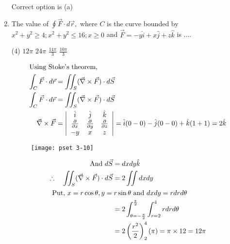 \begin{enumerate}[label=\color{ocre}\textbf{\arabic*.}]
\begin{answer}
\begin{align*}
	\end{align*}
 Correct option is (a)
\end{answer}
\item The value of $\oint \vec{F} \cdot d \vec{r},$ where $C$ is the curve bounded by $x^{2}+y^{2} \geq 4 ; x^{2}+y^{2} \leq 16 ; x \geq 0$
and $\vec{F}=-y \hat{i}+x \hat{j}+z \hat{k}$ is ....
\begin{tasks}(4)
	\task[\textbf{a.}]$ 12\pi$ 
	\task[\textbf{b.}]$ 24 \pi$ 
	\task[\textbf{c.}]$ \frac{14 \pi}{3}$  
	\task[\textbf{d.}]$ \frac{10 \pi}{3}$  
\end{tasks}
\begin{answer}
\begin{align*}
\intertext{Using Stoke's theorem,}\int_{C} \vec{F} \cdot d \vec{r}&=\iint_{S}(\vec{\nabla} \times \vec{F}) \cdot d \vec{S}\\
\int_{C} \vec{F} \cdot d \vec{r}&=\iint_{S}(\vec{\nabla} \times \vec{F}) \cdot d \vec{S}\\
\vec{\nabla} \times \vec{F}&=\left|\begin{array}{ccc}
\hat{i} & \hat{j} & \hat{k} \\
\frac{\partial}{\partial x} & \frac{\partial}{\partial y} & \frac{\partial}{\partial z} \\
-y & x & z
\end{array}\right|=\hat{i}(0-0)-\hat{j}(0-0)+\hat{k}(1+1)=2 \hat{k}\end{align*}
\begin{figure}[H]
	\centering
	\texttt{[image: pset 3-10]}
\end{figure}
\begin{align*}
\text { And } d \vec{S}&=d x d y \hat{k}\\
\therefore \quad \iint_{S}(\vec{\nabla} \times \vec{F}) \cdot d \vec{S}&=2 \iint d x d y\\
\intertext { Put, $ x=r \cos \theta, y=r \sin \theta $  and  $ d x d y=r d r d \theta $}
&=2 \int_{\theta=-\frac{\pi}{2}}^{\frac{\pi}{2}} \int_{r=2}^{4} r d r d \theta\\&=2\left(\frac{r^{2}}{2}\right)_{2}^{4}( \pi)= \pi \times 12=12 \pi
\end{align*}	
\end{answer}

\end{enumerate}


